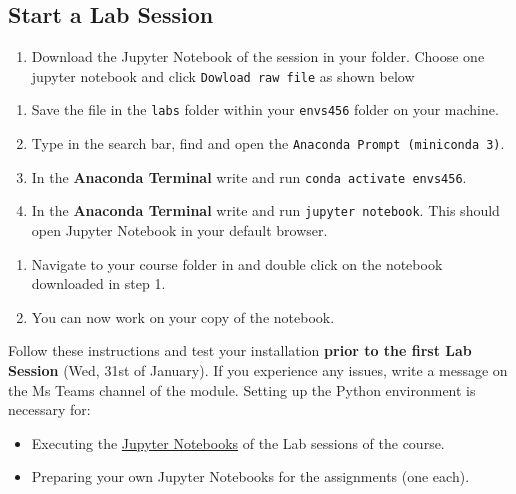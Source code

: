 \documentclass[
  letterpaper,
  DIV=11,
  numbers=noendperiod]{scrreprt}
\providecommand{\tightlist}{%
  \setlength{\itemsep}{0pt}\setlength{\parskip}{0pt}}\usepackage{longtable,booktabs,array}
\begin{document}
\subsection*{Start a Lab Session}\label{start-a-lab-session}

\begin{enumerate}
\def\labelenumi{\arabic{enumi}.}
\tightlist
\item
  Download the Jupyter Notebook of the session in your folder. Choose
  one jupyter notebook and click \texttt{Dowload\ raw\ file} as shown
  below
\end{enumerate}

\begin{enumerate}
\def\labelenumi{\arabic{enumi}.}
\setcounter{enumi}{1}
\tightlist
\item
  Save the file in the \texttt{labs} folder within your \texttt{envs456}
  folder on your machine.
\item
  Type in the search bar, find and open the
  \texttt{Anaconda\ Prompt\ (miniconda\ 3)}.
\item
  In the \textbf{Anaconda Terminal} write and run
  \texttt{conda\ activate\ envs456}.
\item
  In the \textbf{Anaconda Terminal} write and run
  \texttt{jupyter\ notebook}. This should open Jupyter Notebook in your
  default browser.
\end{enumerate}

\begin{enumerate}
\def\labelenumi{\arabic{enumi}.}
\setcounter{enumi}{5}
\tightlist
\item
  Navigate to your course folder in and double click on the notebook
  downloaded in step 1.
\item
  You can now work on your copy of the notebook.
\end{enumerate}

Follow these instructions and test your installation \textbf{prior to
the first Lab Session} (Wed, 31st of January). If you experience any
issues, write a message on the Ms Teams channel of the module. Setting
up the Python environment is necessary for:

\begin{itemize}
\tightlist
\item
  Executing the \href{https://docs.jupyter.org/en/latest/}{Jupyter
  Notebooks} of the Lab sessions of the course.
\item
  Preparing your own Jupyter Notebooks for the assignments (one each).
\end{itemize}
\end{document}
